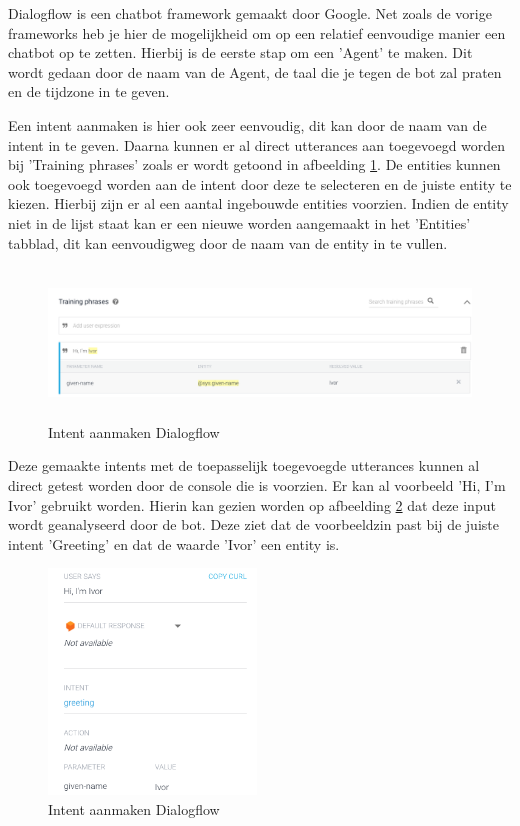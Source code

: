 Dialogflow is een chatbot framework gemaakt door Google. Net zoals de vorige frameworks heb je hier de mogelijkheid om op een relatief eenvoudige manier een chatbot op te zetten. Hierbij is de eerste stap om een 'Agent' te maken. Dit wordt gedaan door de naam van de Agent, de taal die je tegen de bot zal praten en de tijdzone in te geven.

Een intent aanmaken is hier ook zeer eenvoudig, dit kan door de naam van de intent in te geven. Daarna kunnen er al direct utterances aan toegevoegd worden bij 'Training phrases' zoals er wordt getoond in afbeelding \ref{fig:intentsdialogflow}. De entities kunnen ook toegevoegd worden aan de intent door deze te selecteren en de juiste entity te kiezen. Hierbij zijn er al een aantal ingebouwde entities voorzien. Indien de entity niet in de lijst staat kan er een nieuwe worden aangemaakt in het 'Entities' tabblad, dit kan eenvoudigweg door de naam van de entity in te vullen.

\begin{figure}[h!]
	\centering
	\includegraphics[height=4cm]{img/dialogflow_intents.png}
	\caption{Intent aanmaken Dialogflow}
	\label{fig:intentsdialogflow}
\end{figure}

Deze gemaakte intents met de toepasselijk toegevoegde utterances kunnen al direct getest worden door de console die is voorzien. Er kan al voorbeeld 'Hi, I'm Ivor' gebruikt worden. Hierin kan gezien worden op afbeelding \ref{fig:testdialogflow} dat deze input wordt geanalyseerd door de bot. Deze ziet dat de voorbeeldzin past bij de juiste intent 'Greeting' en dat de waarde 'Ivor' een entity is.

\begin{figure}[h!]
	\centering
	\includegraphics[height=6cm]{img/dia_test.png}
	\caption{Intent aanmaken Dialogflow}
	\label{fig:testdialogflow}
\end{figure}

